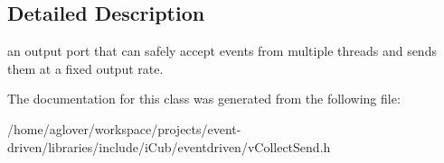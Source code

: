 \subsection{Detailed Description}
an output port that can safely accept events from multiple threads and sends them at a fixed output rate. 

The documentation for this class was generated from the following file\+:\begin{DoxyCompactItemize}
\item 
/home/aglover/workspace/projects/event-\/driven/libraries/include/i\+Cub/eventdriven/v\+Collect\+Send.\+h\end{DoxyCompactItemize}
